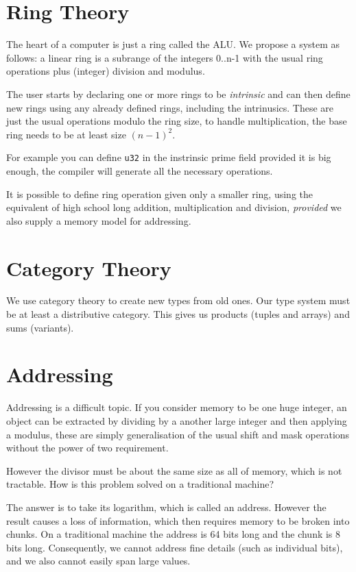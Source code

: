 \documentclass[oneside]{book}
\theoremstyle{plain}
\theoremstyle{definition}
\theoremstyle{plain}
\begin{document}
\section{Ring Theory}
The heart of a computer is just a ring called the ALU. We propose
a system as follows: a linear ring is a subrange of the integers
0..n-1 with the usual ring operations plus (integer) division and
modulus.

The user starts by declaring one or more rings to be {\em intrinsic}
and can then define new rings using any already defined rings, including
the intrinusics. These are just the usual operations modulo the ring size,
to handle multiplication, the base ring needs to be at least size $(n-1)^2$.

For example you can define \verb$u32$ in the instrinsic prime field
provided it is big enough, the compiler will generate all the necessary
operations.

It is possible to define ring operation given only a smaller ring,
using the equivalent of high school long addition, multiplication
and division, {\em provided} we also supply a memory model for
addressing.

\section{Category Theory}
We use category theory to create new types from old ones.
Our type system must be at least a distributive category.
This gives us products (tuples and arrays) and sums (variants).

\section{Addressing}
Addressing is a difficult topic. If you consider memory to be one
huge integer, an object can be extracted by dividing by a
another large integer and then applying a modulus, these are
simply generalisation of the usual shift and mask operations without
the power of two requirement.

However the divisor must be about the same size as all of memory,
which is not tractable. How is this problem solved on a traditional
machine?

The answer is to take its logarithm, which is called an address.
However the result causes a loss of information, which then requires
memory to be broken into chunks. On a traditional machine the address
is 64 bits long and the chunk is 8 bits long. Consequently, we cannot
address fine details (such as individual bits), and we also cannot
easily span large values.
\end{document}
